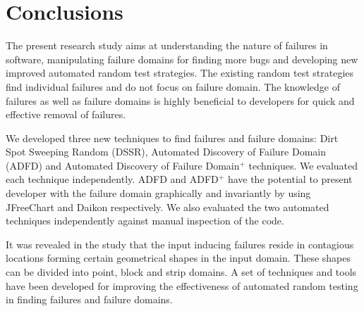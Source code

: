 
\chapter{Conclusions}
\label{chap:conclusions_8}



The present research study aims at understanding the nature of failures in software, manipulating failure domains for finding more bugs and developing new improved automated random test strategies. The existing random test strategies find individual failures and do not focus on failure domain. The knowledge of failures as well as failure domains is highly beneficial to developers for quick and effective removal of failures.


We developed three new techniques to find failures and failure domains: Dirt Spot Sweeping Random (DSSR), Automated Discovery of Failure Domain (ADFD) and Automated Discovery of Failure Domain$^+$ techniques. We evaluated each technique independently. ADFD and ADFD$^+$ have the potential to present developer with the failure domain graphically and invariantly by using JFreeChart and Daikon respectively. We also evaluated the two automated techniques independently against manual inspection of the code.

 
It was revealed in the study that the input inducing failures reside in contagious locations forming certain geometrical shapes in the input domain. These shapes can be divided into point, block and strip domains. A set of techniques and tools have been developed for improving the effectiveness of automated random testing in finding failures and failure domains. 


